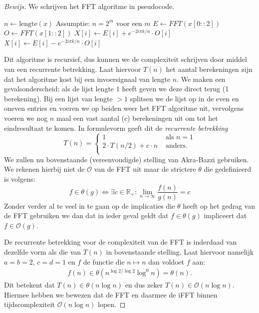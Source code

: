 \documentclass[11pt]{report}
\newcommand{\R}{\mathbb{R}}
\renewcommand{\O}{\mathcal{O}}
\theoremstyle{plain}
\theoremstyle{remark}
\newcommand{\eq}[1]{\begin{eqnarray*} #1 \end{eqnarray*}}
\begin{document}
\begin{proof}[Bewijs]
We schrijven het FFT algoritme in pseudocode.

\begin{algorithmic}
\State $n \gets \text{lengte}(x)$ \Comment Assumptie: $n = 2^m$ voor een $m$
\Else
	\State $E \gets FFT(x[0::2])$ 
	\State $O \gets FFT(x[1::2])$ 
			\State $X[i] \gets E[i] + e^{-2i \pi k/n} \cdot O[i]$
		\Else
			\State $X[i] \gets E[i] - e^{-2i \pi k/n} \cdot O[i]$
		\EndIf
	\EndFor
\EndIf
\State {}
\EndFunction
\end{algorithmic}

Dit algoritme is recursief, dus kunnen we de complexiteit schrijven door middel van een recurrente betrekking. Laat hiervoor $T(n)$ het aantal berekeningen zijn dat het algoritme kost bij een invoersignaal van lengte $n$. We maken een gevalsonderscheid: als de lijst lengte $1$ heeft geven we deze direct terug (1 berekening). Bij een lijst van lengte $>1$ splitsen we de lijst op in de even en oneven entries en voeren we op beiden weer het FFT algoritme uit, vervolgens voeren we nog $n$ maal een vast aantal ($c$) berekeningen uit om tot het eindresultaat te komen. In formulevorm geeft dit de \emph{recurrente betrekking}
\[
T(n) = \begin{cases}
    1 &\text{ als } n = 1 \\
      2\cdot T(n/2) + c\cdot n &\text{ anders}. \\
\end{cases}
\]
We zullen nu bovenstaande (vereenvoudigde) stelling van Akra-Bazzi gebruiken. We rekenen hierbij niet de $\O$ van de FFT uit maar de strictere $\theta$ die gedefinieerd is volgens:
\[
f \in \theta(g) \Leftrightarrow \exists c \in \R_+: \lim_{n \to \infty} \frac{f(n)}{g(n)} = c
\]
Zonder verder al te veel in te gaan op de implicaties die $\theta$ heeft op het gedrag van de FFT gebruiken we dan dat in ieder geval geldt dat $f \in \theta(g)$ impliceert dat $f \in \O(g)$. 

De recurrente betrekking voor de complexiteit van de FFT is inderdaad van dezelfde vorm als die van $T(n)$ in bovenstaande stelling.
Laat hiervoor namelijk $a=b=2$, $c=d=1$ en $f$ de functie die $n\mapsto n$ dan voldoet $f$ aan:
\eq{
  f(n) \in \theta(n^{\log 2/\log 2} \log^0 n)=\theta(n).
}
Dit betekent dat $T(n) \in \theta(n \log n)$ en dus zeker $T(n) \in \O(n \log n)$.
Hiermee hebben we bewezen dat de FFT en daarmee de iFFT binnen tijdscomplexiteit $\O(n\log n)$ lopen. 
\end{proof}
\end{document}
